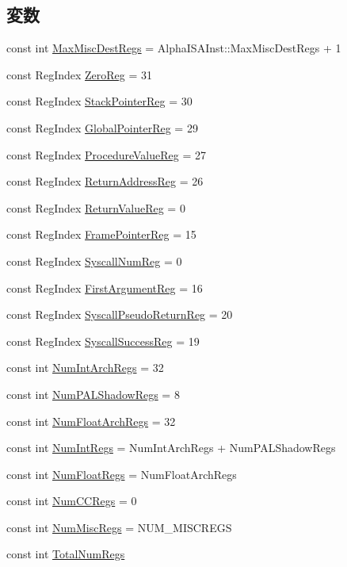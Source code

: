 \subsection*{変数}
\begin{DoxyCompactItemize}
\item 
const int \hyperlink{namespaceAlphaISA_a47db6c8581feb5d9094784b480156f0b}{MaxMiscDestRegs} = AlphaISAInst::MaxMiscDestRegs + 1
\item 
const RegIndex \hyperlink{namespaceAlphaISA_a38e079cf64d8a3ced6ce8e52ce269a5e}{ZeroReg} = 31
\item 
const RegIndex \hyperlink{namespaceAlphaISA_a344fcaf70f4d9d6fe84dc5eda59e49eb}{StackPointerReg} = 30
\item 
const RegIndex \hyperlink{namespaceAlphaISA_a569ad17fb9f0eb70ebdb6f8b1c1ab5ce}{GlobalPointerReg} = 29
\item 
const RegIndex \hyperlink{namespaceAlphaISA_a918dcb458d920fe32f90d942585cc4e5}{ProcedureValueReg} = 27
\item 
const RegIndex \hyperlink{namespaceAlphaISA_ac35e74d63805165abcadf5e48ba17caf}{ReturnAddressReg} = 26
\item 
const RegIndex \hyperlink{namespaceAlphaISA_a5aa17c403dc1152a73ef61c17f4e02cf}{ReturnValueReg} = 0
\item 
const RegIndex \hyperlink{namespaceAlphaISA_a3bd8c9c7538a065181e1e54fea758ada}{FramePointerReg} = 15
\item 
const RegIndex \hyperlink{namespaceAlphaISA_a208b182e71958af642826cde032dcd60}{SyscallNumReg} = 0
\item 
const RegIndex \hyperlink{namespaceAlphaISA_a4ea7a0e850916ddcb5d2b77078e3e0c7}{FirstArgumentReg} = 16
\item 
const RegIndex \hyperlink{namespaceAlphaISA_a6b71a09200f90f7292045d3560f10dad}{SyscallPseudoReturnReg} = 20
\item 
const RegIndex \hyperlink{namespaceAlphaISA_a6c8c50158f99f454a2f011a1806f76c2}{SyscallSuccessReg} = 19
\item 
const int \hyperlink{namespaceAlphaISA_a405c0abe85dc0da846c120e3b31f375c}{NumIntArchRegs} = 32
\item 
const int \hyperlink{namespaceAlphaISA_a28eb16586861c2678813557695525732}{NumPALShadowRegs} = 8
\item 
const int \hyperlink{namespaceAlphaISA_a9ec947def3616ab9415089776195fa09}{NumFloatArchRegs} = 32
\item 
const int \hyperlink{namespaceAlphaISA_a9c412b5118ce369570c156c4e156638a}{NumIntRegs} = NumIntArchRegs + NumPALShadowRegs
\item 
const int \hyperlink{namespaceAlphaISA_a627b25288f2452be107872a138df8b85}{NumFloatRegs} = NumFloatArchRegs
\item 
const int \hyperlink{namespaceAlphaISA_a717317b863009b3e1b683c3bdddb9fd3}{NumCCRegs} = 0
\item 
const int \hyperlink{namespaceAlphaISA_a568d4aa96dd7cd963f3b1b1b0446c9c6}{NumMiscRegs} = NUM\_\-MISCREGS
\item 
const int \hyperlink{namespaceAlphaISA_a578a3508d56f10e933ba9559e2cf907c}{TotalNumRegs}
\end{DoxyCompactItemize}
